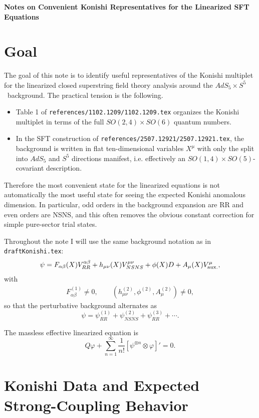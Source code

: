 \documentclass[12pt]{article}
\def\be{\begin{equation}}
\def\ee{\end{equation}}
\def\ie{\begin{equation}\begin{aligned}}
\def\fe{\end{aligned}\end{equation}}
\newcommand{\adss}{\ensuremath{AdS_5\times S^5}}
\begin{document}
\begin{center}
{\Large\bf Notes on Convenient Konishi Representatives for the Linearized SFT Equations}
\end{center}

\tableofcontents

\section{Goal}

The goal of this note is to identify useful representatives of the Konishi multiplet for the
linearized closed superstring field theory analysis around the \adss\ background.
The practical tension is the following.

\begin{itemize}
\item Table 1 of \texttt{references/1102.1209/1102.1209.tex} organizes the Konishi multiplet in terms of
the full $SO(2,4)\times SO(6)$ quantum numbers.
\item In the SFT construction of \texttt{references/2507.12921/2507.12921.tex}, the background is written in
flat ten-dimensional variables $X^\mu$ with only the split into $AdS_5$ and $S^5$ directions manifest, i.e.
effectively an $SO(1,4)\times SO(5)$-covariant description.
\end{itemize}

Therefore the most convenient state for the linearized equations is not automatically the most
useful state for seeing the expected Konishi anomalous dimension. In particular, odd orders in the
background expansion are RR and even orders are NSNS, and this often removes the obvious
constant correction for simple pure-sector trial states.

Throughout the note I will use the same background notation as in \texttt{draftKonishi.tex}:
\ie
\psi = F_{\alpha\beta}(X)V^{\alpha\beta}_{RR}
+ h_{\mu\nu}(X)V^{\mu\nu}_{NSNS}
+ \phi(X)D
+ A_\mu(X)V^\mu_{\rm aux.},
\fe
with
\ie
F^{(1)}_{\alpha\beta}\neq 0,\qquad
(h^{(2)}_{\mu\nu},\phi^{(2)},A^{(2)}_\mu)\neq 0,
\fe
so that the perturbative background alternates as
\be
\psi=\psi^{(1)}_{RR}+\psi^{(2)}_{NSNS}+\psi^{(3)}_{RR}+\cdots.
\ee

The massless effective linearized equation is
\be
Q\varphi+\sum_{n=1}^{\infty}\frac{1}{n!}[\psi^{\otimes n}\otimes\varphi]'=0.
\ee

\section{Konishi Data and Expected Strong-Coupling Behavior}
\end{document}
